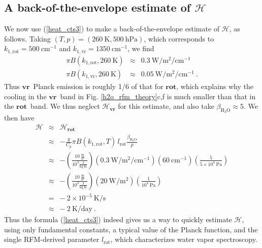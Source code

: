 \documentclass{ametsoc}
\newcommand{\beqa}{\begin{eqnarray}}
\newcommand{\eeqa}{\end{eqnarray}}
\newcommand{\beqanonum}{\begin{eqnarray*}}
\newcommand{\eeqanonum}{\end{eqnarray*}}
\newcommand{\n}{\nonumber}
\newcommand{\eqnref}[1]{(\ref{#1})}
\newcommand{\second}{\ensuremath{\mathrm{s}}}
\newcommand{\kg}{\ensuremath{\mathrm{kg}}}
\newcommand{\meter}{\ensuremath{\mathrm{m}}}
\newcommand{\Kelvin}{\ensuremath{\mathrm{K}}}
\newcommand{\Wmsq}{\ensuremath{\mathrm{W/m^2}}}
\newcommand{\joule}{\ensuremath{\mathrm{J}}}
\newcommand{\cminverse}{\ensuremath{\mathrm{cm^{-1}}}}
\newcommand{\Pa}{\ensuremath{\mathrm{Pa}}}
\newcommand{\hPa}{\ensuremath{\mathrm{hPa}}}
\newcommand{\Cp}{\ensuremath{C_p}}
\newcommand{\htwo}{\ensuremath{\mathrm{H_2O}}}
\newcommand{\ch}{\ensuremath{\mathcal{H}}}
\newcommand{\konerot}{\ensuremath{k_{1,\mathrm{rot}}}}
\newcommand{\konevr}{\ensuremath{k_{1,\mathrm{vr}}}}
\newcommand{\lrot}{\ensuremath{l_\mathrm{rot}}}
\newcommand{\vr}{\ensuremath{\mathbf{vr}}}
\newcommand{\rot}{\ensuremath{\mathbf{rot}}}
\begin{document}
\subsection{A back-of-the-envelope estimate of \ch} \label{sec_2k}
 We now use \eqnref{heat_cts3} to make a back-of-the-envelope estimate of \ch, as follows.   Taking $(T,p)=(260\ \Kelvin,500\ \hPa)$, which corresponds to $\konerot=500\ \cminverse$ and $\konevr=1350\ \cminverse$, we find
\beqa
	 \pi B(\konerot,260\ \Kelvin) & \approx & 0.3 \ \Wmsq/\cminverse \n \\ 
	 \pi B(\konevr,260\ \Kelvin)  & \approx  & 0.05 \ \Wmsq/\cminverse \n \ .
\eeqa 
Thus \vr\ Planck emission is roughly 1/6 of that for \rot, which explains why the cooling in the \vr\ band in Fig. \ref{h2o_rfm_theory}c,f is much smaller than that in the \rot\ band. We thus neglect $\ch_\vr$ for this estimate, and  also take $\beta_\htwo \approx 5$. We then have
\beqanonum
	\ch & \approx & \ch_\rot \\
		  & \approx &- \frac{g}{\Cp}\pi B(\konerot,T)\, \lrot \frac{\beta_{\htwo}}{p} \\
		  & \approx &- \left(\frac{10\ \frac{\meter}{\second^2}}{10^3 \frac{\joule}{\kg\ \Kelvin}}\right) \left(0.3 \ \Wmsq/\cminverse\right)(60 \ \cminverse)\left(\frac{5}{5\times 10^4 \ \Pa}\right) \\
		  & \approx & - \left(\frac{10\ \frac{\meter}{\second^2}}{10^3 \frac{\joule}{\kg\ \Kelvin}}\right)(20\ \Wmsq)\left(\frac{1}{10^4\ \Pa}\right)  \\
		  & = & -\ 2 \times 10^{-5}\ \Kelvin/\second \\
		  & \approx & -\ 2\ \text{K/day} \ .
\eeqanonum
 Thus the formula \eqnref{heat_cts3} indeed gives us a way to quickly estimate \ch, using only fundamental constants,  a typical value of the Planck function, and the single RFM-derived parameter \lrot, which characterizes  water vapor spectroscopy.

\end{document}
